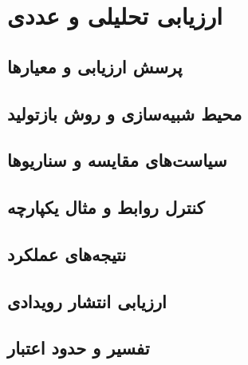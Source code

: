 \chapter{ارزیابی تحلیلی و عددی}

\label{chap:evaluation}

\section{پرسش ارزیابی و معیارها}

\section{محیط شبیه‌سازی و روش بازتولید}

\section{سیاست‌های مقایسه و سناریوها}

\section{کنترل روابط و مثال یکپارچه}

\section{نتیجه‌های عملکرد}

\section{ارزیابی انتشار رویدادی}

\section{تفسیر و حدود اعتبار}
